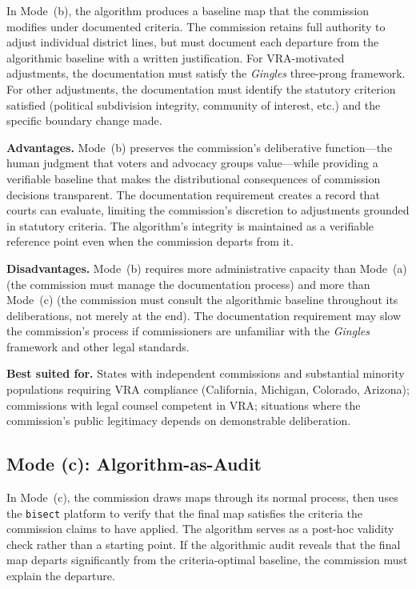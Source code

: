 In Mode~(b), the algorithm produces a baseline map that the commission modifies under documented criteria. The commission retains full authority to adjust individual district lines, but must document each departure from the algorithmic baseline with a written justification. For VRA-motivated adjustments, the documentation must satisfy the \textit{Gingles} three-prong framework. For other adjustments, the documentation must identify the statutory criterion satisfied (political subdivision integrity, community of interest, etc.) and the specific boundary change made.

\textbf{Advantages.} Mode~(b) preserves the commission's deliberative function---the human judgment that voters and advocacy groups value---while providing a verifiable baseline that makes the distributional consequences of commission decisions transparent. The documentation requirement creates a record that courts can evaluate, limiting the commission's discretion to adjustments grounded in statutory criteria. The algorithm's integrity is maintained as a verifiable reference point even when the commission departs from it.

\textbf{Disadvantages.} Mode~(b) requires more administrative capacity than Mode~(a) (the commission must manage the documentation process) and more than Mode~(c) (the commission must consult the algorithmic baseline throughout its deliberations, not merely at the end). The documentation requirement may slow the commission's process if commissioners are unfamiliar with the \textit{Gingles} framework and other legal standards.

\textbf{Best suited for.} States with independent commissions and substantial minority populations requiring VRA compliance (California, Michigan, Colorado, Arizona); commissions with legal counsel competent in VRA; situations where the commission's public legitimacy depends on demonstrable deliberation.

\subsection{Mode (c): Algorithm-as-Audit}

In Mode~(c), the commission draws maps through its normal process, then uses the \texttt{bisect} platform to verify that the final map satisfies the criteria the commission claims to have applied. The algorithm serves as a post-hoc validity check rather than a starting point. If the algorithmic audit reveals that the final map departs significantly from the criteria-optimal baseline, the commission must explain the departure.


